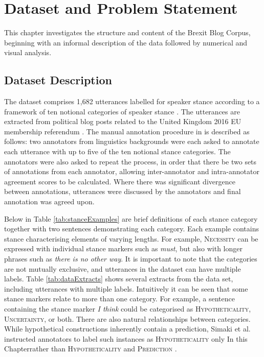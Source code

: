 \documentclass[Dissertation.tex]{subfiles}
\begin{document}
\chapter{Dataset and Problem Statement}
This chapter investigates the structure and content of the Brexit Blog Corpus, beginning with an informal description of the data followed by numerical and visual analysis.
\section{Dataset Description} \label{Data}

The dataset comprises 1,682 utterances  labelled for speaker stance according to a framework of ten notional categories of speaker stance \cite{simakiAnnotatingSpeakerStance2017}. The utterances are extracted from political blog posts related to the United Kingdom 2016 EU membership referendum \cite{simakiAnnotatingSpeakerStance2017}. The manual annotation procedure in \cite{simakiAnnotatingSpeakerStance2017} is described as follows: two annotators from linguistics backgrounds were each asked to annotate each utterance with up to five of the ten notional stance categories. The annotators were also asked to repeat the process, in order that there be two sets of annotations from each annotator, allowing inter-annotator and intra-annotator agreement scores to be calculated. Where there was significant divergence between annotations, utterances were discussed by the annotators and final annotation was agreed upon. 

Below in Table \ref{tab:stanceExamples} are brief definitions of each stance category together with two sentences demonstrating each category. Each example contains stance characterising elements of varying lengths. For example, {\small\scshape Necessity} can be expressed with individual stance markers such as \textit{must}, but also with longer phrases such as \textit{there is no other way}. It is important to note that the categories are not mutually exclusive, and utterances in the dataset can have multiple labels. Table \ref{tab:dataExtracts} shows several extracts from the data set, including utterances with multiple labels. Intuitively it can be seen that some stance markers relate to more than one category. For example, a sentence containing the stance marker \textit{I think} could be categorised as {\small \scshape Hypotheticality}, {\small \scshape Uncertainty}, or both. There are also natural relationships between categories. While hypothetical constructions inherently contain a prediction, Simaki et al. instructed annotators to label such instances as {\small \scshape Hypotheticality} only In this Chapterrather than {\small \scshape Hypotheticality} and {\small \scshape Prediction} \cite{simakiAnnotatingSpeakerStance2017}.
\end{document}
